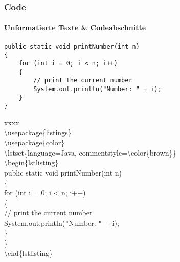 \begin{frame}[fragile]
\frametitle{Code}
\framesubtitle{Unformatierte Texte \& Codeabschnitte}
\vspace{3mm}
\scriptsize
{}
\begin{lstlisting}
public static void printNumber(int n)
{
    for (int i = 0; i < n; i++)
    {
        // print the current number
        System.out.println("Number: " + i);
    }
}
\end{lstlisting}

\footnotesize
\vspace{-2mm}


\begin{ttfamily}
\begin{tabbing}
xx\=xx\=\kill\\
\color{nounibaredI}\textbackslash usepackage\color{black}\{listings\}\\
\color{nounibaredI}\textbackslash usepackage\color{black}\{color\}\\
\color{nounibaredI}\textbackslash lstset\color{black}\{language=Java, commentstyle=\color{nounibaredI}\textbackslash color\color{black}\{brown\}\}\\
\color{unibablueI}\textbackslash begin\color{black}\{lstlisting\}\\
public static void printNumber(int n)\\
\{\\
\>for (int i = 0; i < n; i++)\\
\>\{\\
\>\>// print the current number\\
\>\>System.out.println(\verb|"|Number: \verb|"| + i);\\
\>\}\\
\}\\
\color{unibablueI}\textbackslash end\color{black}\{lstlisting\}\\
\end{tabbing}
\end{ttfamily}
\normalsize
\end{frame}




